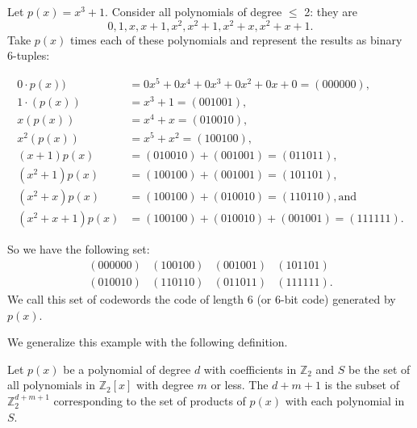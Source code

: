 \begin{example}{}
Let $p(x) = x^3 + 1$.  Consider all polynomials of degree $\le$ 2: they are \[0, 1, x, x+1, x^2, x^2+1, x^2 + x, x^2 + x + 1.\]  Take $p(x)$ times each of these polynomials and represent the results as binary 6-tuples:

\begin{align*}
0\cdot p(x))&=0x^5+0x^4+0x^3+0x^2+0x+0=(000000),\\
1\cdot (p(x))&= x^3 + 1=(001001),\\ 
x(p(x))&=x^4+x= (010010),\\
x^2(p(x))&=x^5+x^2=(100100),\\
(x+1)p(x)&=(010010)+(001001)=(011011),\\
(x^2+1)p(x)&=(100100)+(001001)=(101101),\\ 
(x^2+x)p(x)&=(100100)+(010010)=(110110), \textrm{and}\\
(x^2+x+1)p(x)&=(100100)+(010010)+(001001)=(111111).
\end{align*}

So we have the following set:
 \[ \begin{array}{cccc}
(000000) & (100100) & (001001) & (101101) \\
(010010) & (110110) & (011011) & (111111).
\end{array}\]
We call this set of codewords the code of length 6 (or 6-bit code) generated by $p(x)$.
\end {example}

We generalize this example with the following definition.

\begin{defn}\label{definition:Polynomial Code Basics:polynomialcode}
Let $p(x)$ be a polynomial of degree $d$ with coefficients in $\mathbb{Z}_2$ and $S$ be the set of all polynomials in $\mathbb{Z}_2[x]$ with  degree $m$ or less. The   $d+m+1$  is the subset of $\mathbb{Z}_2^{d+m+1}$ corresponding to the set of products of $p(x)$ with each polynomial in $S$. 
\end {defn}


